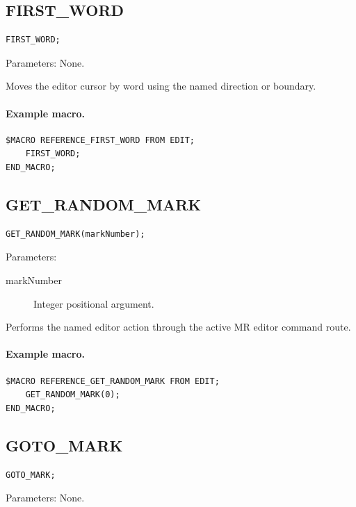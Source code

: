\documentclass[a4paper,10pt,twoside,openany]{book}
\newenvironment{mrmacextension}{\begin{changebar}}{\end{changebar}}
\begin{document}
\label{prim:procedure-first-word}
\subsection*{FIRST\_WORD}
\begin{verbatim}
FIRST_WORD;
\end{verbatim}
Parameters: None.

Moves the editor cursor by word using the named direction or boundary.

\paragraph{Example macro.}
\begin{verbatim}
$MACRO REFERENCE_FIRST_WORD FROM EDIT;
    FIRST_WORD;
END_MACRO;
\end{verbatim}

\begin{mrmacextension}
\label{prim:procedure-get-random-mark}
\subsection*{GET\_RANDOM\_MARK}
\begin{verbatim}
GET_RANDOM_MARK(markNumber);
\end{verbatim}
Parameters:
\begin{description}
\item[markNumber] Integer positional argument.
\end{description}

Performs the named editor action through the active MR editor command route.

\paragraph{Example macro.}
\begin{verbatim}
$MACRO REFERENCE_GET_RANDOM_MARK FROM EDIT;
    GET_RANDOM_MARK(0);
END_MACRO;
\end{verbatim}
\end{mrmacextension}

\label{prim:procedure-goto-mark}
\subsection*{GOTO\_MARK}
\begin{verbatim}
GOTO_MARK;
\end{verbatim}
Parameters: None.
\end{document}
